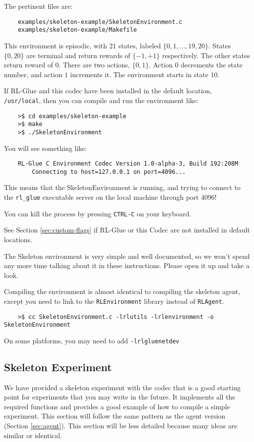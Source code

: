 \documentclass[11pt]{article}
\begin{document}
The pertinent files are:
\begin{verbatim}
	examples/skeleton-example/SkeletonEnvironment.c
	examples/skeleton-example/Makefile
\end{verbatim}

This environment is episodic, with 21 states, labeled $\{0, 1,\ldots,19,20\}$. States $\{0, 20\}$ are terminal and return rewards of $\{-1, +1\}$ respectively.  The other states return reward of $0$.
There are two actions, $\{0, 1\}$.  Action $0$ decrements the state number, and action $1$ increments it. The environment starts in state 10.

If RL-Glue and this codec have been installed in the default location, \texttt{/usr/local}, then you can compile and run the environment like:
\begin{verbatim}
	>$ cd examples/skeleton-example
	>$ make
	>$ ./SkeletonEnvironment
\end{verbatim}

You will see something like:
\begin{verbatim}
	RL-Glue C Environment Codec Version 1.0-alpha-3, Build 192:208M
		Connecting to host=127.0.0.1 on port=4096...
\end{verbatim}

This means that the SkeletonEnvironment is running, and trying to connect to the \texttt{rl\_glue} executable server on the local machine through port $4096$! 

You can kill the process by pressing \texttt{CTRL-C} on your keyboard.

See Section \ref{sec:custom-flags} if RL-Glue or this Codec are not installed in default locations.

The Skeleton environment is very simple and well documented, so we won't spend any more time talking about it in these instructions.
Please open it up and take a look.

Compiling the environment is almost identical to compiling the skeleton agent, except you need to link to the \texttt{RLEnvironment} library instead of \texttt{RLAgent}.
\begin{verbatim}
	>$ cc SkeletonEnvironment.c -lrlutils -lrlenvironment -o SkeletonEnvironment
\end{verbatim}

On some platforms, you may need to add \texttt{-lrlgluenetdev}

\subsection{Skeleton Experiment}
We have provided a skeleton experiment with the codec that is a good starting point for experiments that you may write in the future.
It implements all the required functions and provides a good example of how to compile a simple experiment.  This section will follow the same 
pattern as the agent version (Section \ref{sec:agent}).  This section will be less detailed because many ideas are similar or identical.
\end{document}

